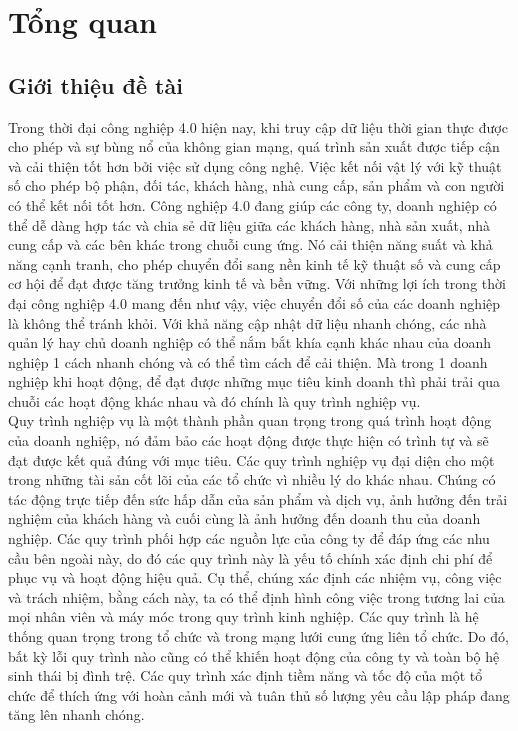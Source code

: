 \section{Tổng quan}
\subsection{Giới thiệu đề tài}

\hspace{0.5cm}Trong thời đại công nghiệp 4.0 hiện nay, khi truy cập dữ liệu thời gian thực được cho phép và sự bùng nổ của không gian mạng, quá trình sản xuất được tiếp cận và cải thiện tốt hơn bởi việc sử dụng công nghệ. Việc kết nối vật lý với kỹ thuật số cho phép bộ phận, đối tác, khách hàng, nhà cung cấp, sản phẩm và con người có thể kết nối tốt hơn. Công nghiệp 4.0 đang giúp các công ty, doanh nghiệp có thể dễ dàng hợp tác và chia sẻ dữ liệu giữa các khách hàng, nhà sản xuất, nhà cung cấp và các bên khác trong chuỗi cung ứng. Nó cải thiện năng suất và khả năng cạnh tranh, cho phép chuyển đổi sang nền kinh tế kỹ thuật số và cung cấp cơ hội để đạt được tăng trưởng kinh tế và bền vững. Với những lợi ích trong thời đại công nghiệp 4.0 mang đến như vậy, việc chuyển đổi số của các doanh nghiệp là không thể tránh khỏi. Với khả năng cập nhật dữ liệu nhanh chóng, các nhà quản lý hay chủ doanh nghiệp có thể nắm bắt khía cạnh khác nhau của doanh nghiệp 1 cách nhanh chóng và có thể tìm cách để cải thiện. Mà trong 1 doanh nghiệp khi hoạt động, để đạt được những mục tiêu kinh doanh thì phải trải qua chuỗi các hoạt động khác nhau và đó chính là quy trình nghiệp vụ.\\

Quy trình nghiệp vụ là một thành phần quan trọng trong quá trình hoạt động của doanh nghiệp, nó đảm bảo các hoạt động được thực hiện có trình tự và sẽ đạt được kết quả đúng với mục tiêu. Các quy trình nghiệp vụ đại diện cho một trong những tài sản cốt lõi của các tổ chức vì nhiều lý do khác nhau. Chúng có tác động trực tiếp đến sức hấp dẫn của sản phẩm và dịch vụ, ảnh hưởng đến trải nghiệm của khách hàng và cuối cùng là ảnh hưởng đến doanh thu của doanh nghiệp. Các quy trình phối hợp các nguồn lực của công ty để đáp ứng các nhu cầu bên ngoài này, do đó các quy trình này là yếu tố chính xác định chi phí để phục vụ và hoạt động hiệu quả. Cụ thể, chúng xác định các nhiệm vụ, công việc và trách nhiệm, bằng cách này, ta có thể định hình công việc trong tương lai của mọi nhân viên và máy móc trong quy trình kinh nghiệp. Các quy trình là hệ thống quan trọng trong tổ chức và trong mạng lưới cung ứng liên tổ chức. Do đó, bất kỳ lỗi quy trình nào cũng có thể khiến hoạt động của công ty và toàn bộ hệ sinh thái bị đình trệ. Các quy trình xác định tiềm năng và tốc độ của một tổ chức để thích ứng với hoàn cảnh mới và tuân thủ số lượng yêu cầu lập pháp đang tăng lên nhanh chóng.\\

